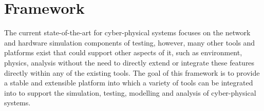 











\section{Framework}
\label{sec:framework}
The current state-of-the-art for cyber-physical systems focuses on the network and hardware simulation components of testing, however, many other tools and platforms exist that could support other aspects of it, such as environment, physics, analysis without the need to directly extend or integrate these features directly within any of the existing tools. 
The goal of this framework is to provide a stable and extensible platform into which a variety of tools can be integrated into to support the simulation, testing, modelling and analysis of cyber-physical systems.

